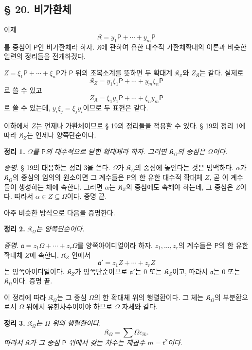 \subsection*{§ 20. 비가환체}

이제
\[
        \mathfrak K
        =y_1\mathsf P+\cdots+y_m\mathsf P
\]
를 중심이 \(\mathsf P\)인 비가환체라 하자. \(\mathfrak K\)에 관하여 유한 대수적 가환체확대의 이론과 비슷한 일련의 정리들을 전개하겠다.

\(Z=\xi_1\mathsf P+\cdots+\xi_n\mathsf P\)가 \(\mathsf P\) 위의 초복소계를 뜻하면 두 확대계 \(\mathfrak K_Z\)와 \(Z_{\mathfrak K}\)는 같다. 실제로
\[
        \mathfrak K_Z
        =y_1\xi_1\mathsf P+\cdots+y_m\xi_n\mathsf P
\]
로 쓸 수 있고
\[
        Z_{\mathfrak K}
        =\xi_1y_1\mathsf P+\cdots+\xi_ny_m\mathsf P
\]
로 쓸 수 있는데, \(y_i\xi_j=\xi_jy_i\)이므로 두 표현은 같다.

이하에서 \(Z\)는 언제나 가환체이므로 § 19의 정리들을 적용할 수 있다. § 19의 정리 1에 따라 \(\mathfrak K_Z\)는 언제나 양쪽단순이다.

\textbf{정리 1.} \emph{\(\Omega\)를 \(\mathsf P\)의 대수적으로 닫힌 확대체라 하자. 그러면 \(\mathfrak K_\Omega\)의 중심은 \(\Omega\)이다.}

\emph{증명.} § 19의 대응하는 정리 3을 쓴다. \(\Omega\)가 \(\mathfrak K_\Omega\)의 중심에 놓인다는 것은 명백하다. \(\alpha\)가 \(\mathfrak K_\Omega\)의 중심의 임의의 원소이면 그 계수들은 \(\mathsf P\)의 한 유한 대수적 확대체 \(Z\), 곧 이 계수들이 생성하는 체에 속한다. 그러면 \(\alpha\)는 \(\mathfrak K_Z\)의 중심에도 속해야 하는데, 그 중심은 \(Z\)이다. 따라서 \(\alpha\in Z\subseteq\Omega\)이다. 증명 끝.

아주 비슷한 방식으로 다음을 증명한다.

\textbf{정리 2.} \emph{\(\mathfrak K_\Omega\)는 양쪽단순이다.}

\emph{증명.} \(\mathfrak a=z_1\Omega+\cdots+z_r\Omega\)를 양쪽아이디얼이라 하자. \(z_1,\ldots,z_r\)의 계수들은 \(\mathsf P\)의 한 유한확대체 \(Z\)에 속한다. \(\mathfrak K_Z\) 안에서
\[
        \mathfrak a'=z_1Z+\cdots+z_rZ
\]
는 양쪽아이디얼이다. \(\mathfrak K_Z\)가 양쪽단순이므로 \(\mathfrak a'\)는 0 또는 \(\mathfrak K_Z\)이고, 따라서 \(\mathfrak a\)는 0 또는 \(\mathfrak K_\Omega\)이다. 증명 끝.

이 정리에 따라 \(\mathfrak K_\Omega\)는 그 중심 \(\Omega\)의 한 확대체 위의 행렬환이다. 그 체는 \(\mathfrak K_\Omega\)의 부분환으로서 \(\Omega\) 위에서 유한차수이어야 하므로 \(\Omega\) 자체와 같다.

\textbf{정리 3.} \emph{\(\mathfrak K_\Omega\)는 \(\Omega\) 위의 행렬환이다.}
\[
        \mathfrak K_\Omega=\sum\Omega c_{ik}.
\]
\emph{따라서 \(\mathfrak K\)가 그 중심 \(\mathsf P\) 위에서 갖는 차수는 제곱수 \(m=t^2\)이다.}


